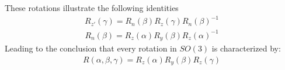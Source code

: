 \documentclass[compress,aspectratio=169,10pt,usenames,dvipsnames]{beamer}
\begin{document}
%
%
\begin{frame}
\vfill
These rotations illustrate the following identities
\vfill
\begin{equation}
	\begin{aligned}
		R_{z'}(\gamma) = R_n(\beta)R_z(\gamma)R_n(\beta)^{-1}
	\end{aligned}
\end{equation}
\begin{equation}
	\begin{aligned}
		R_n(\beta) = R_z(\alpha)R_y(\beta)R_z(\alpha)^{-1}
	\end{aligned}
\end{equation}
\vfill
Leading to the conclusion that every rotation in $SO(3)$ is characterized by:
\vfill
\begin{equation}
	\begin{aligned}
		R(\alpha,\beta,\gamma) = R_z(\alpha)R_y(\beta)R_z(\gamma)
	\end{aligned}
\end{equation}
\vfill
\end{frame}
\end{document}

